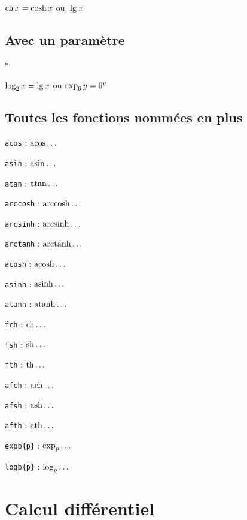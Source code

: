 \documentclass[12pt,a4paper]{article}
\makeatletter
\theoremstyle{definition}
\newcounter{paraexample}[subsubsection]
\newcommand\@newexample@abstract[2]{%
	\paragraph{%
		#1%
		\if\relax\detokenize{#2}\relax\else {} -- #2\fi%
	}%
}
\newcommand\newparaexample{\@ifstar{\@newparaexample@star}{\@newparaexample@no@star}}
\newcommand\@newparaexample@no@star[1]{%
	\refstepcounter{paraexample}%
	\@newexample@abstract{Exemple \theparaexample}{#1}%
}
\newcommand\@newparaexample@star[1]{%
	\@newexample@abstract{Exemple}{#1}%
}
\makeatother
\begin{document}
\begin{latexex}
$\operatorname{\operatorname{ch}} x = \cosh x$ ou
$\lg x$
\end{latexex}




\subsection{Avec un paramètre}

\newparaexample*{}

\begin{latexex}
$\log_{2} x = \lg x$ ou
$\exp_{6} y = 6^y$
\end{latexex}




\subsection{Toutes les fonctions nommées en plus} \label{tnsana-all-named-functions}

\vspace{-1em}

\begin{multicols}{2}
    \verb+acos+ : $\operatorname{\operatorname{acos}}\dots$

    \verb+asin+ : $\operatorname{\operatorname{asin}}\dots$

    \verb+atan+ : $\operatorname{\operatorname{atan}}\dots$

    \verb+arccosh+ : $\operatorname{\operatorname{arccosh}}\dots$

    \verb+arcsinh+ : $\operatorname{\operatorname{arcsinh}}\dots$

    \verb+arctanh+ : $\operatorname{\operatorname{arctanh}}\dots$

    \verb+acosh+ : $\operatorname{\operatorname{acosh}}\dots$

    \verb+asinh+ : $\operatorname{\operatorname{asinh}}\dots$

    \verb+atanh+ : $\operatorname{\operatorname{atanh}}\dots$

    \verb+fch+ : $\operatorname{\operatorname{ch}}\dots$

    \verb+fsh+ : $\operatorname{\operatorname{sh}}\dots$

    \verb+fth+ : $\operatorname{\operatorname{th}}\dots$

    \verb+afch+ : $\operatorname{\operatorname{ach}}\dots$

    \verb+afsh+ : $\operatorname{\operatorname{ash}}\dots$

    \verb+afth+ : $\operatorname{\operatorname{ath}}\dots$

    \verb+expb{p}+ : $\exp_{p}\dots$

    \verb+logb{p}+ : $\log_{p}\dots$
\end{multicols}
\section{Calcul différentiel}
\end{document}
